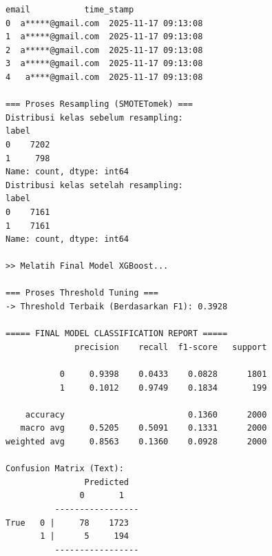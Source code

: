 \begin{lstlisting}[caption={Output 3}]
              email           time_stamp  
0  a*****@gmail.com  2025-11-17 09:13:08  
1  a*****@gmail.com  2025-11-17 09:13:08  
2  a*****@gmail.com  2025-11-17 09:13:08  
3  a*****@gmail.com  2025-11-17 09:13:08  
4   a****@gmail.com  2025-11-17 09:13:08  

=== Proses Resampling (SMOTETomek) ===
Distribusi kelas sebelum resampling: 
label
0    7202
1     798
Name: count, dtype: int64
Distribusi kelas setelah resampling: 
label
0    7161
1    7161
Name: count, dtype: int64

>> Melatih Final Model XGBoost...

=== Proses Threshold Tuning ===
-> Threshold Terbaik (Berdasarkan F1): 0.3928

===== FINAL MODEL CLASSIFICATION REPORT =====
              precision    recall  f1-score   support

           0     0.9398    0.0433    0.0828      1801
           1     0.1012    0.9749    0.1834       199

    accuracy                         0.1360      2000
   macro avg     0.5205    0.5091    0.1331      2000
weighted avg     0.8563    0.1360    0.0928      2000

Confusion Matrix (Text):
                Predicted
               0       1
          -----------------
True   0 |     78    1723
       1 |      5     194
          -----------------
\end{lstlisting}

